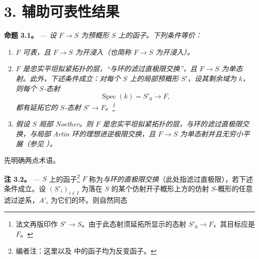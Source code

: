 
\section*{3. 辅助可表性结果}

\medskip\noindent{}\textbf{命题 3.1。} --- \textit{设 \(F\to S\) 为预概形 \(S\) 上的函子。下列条件等价：}

\begin{enumerate}\item[(i)]\textit{\(F\) 可表，且 \(F\to S\) 为开浸入（也简称 \(F\to S\) 为开浸入）。}

\item[(ii)]\textit{\(F\) 是忠实平坦拟紧拓扑的层，“与环的滤过直极限交换”，且 \(F\to S\) 为单态射。此外，下述条件成立：对每个 \(S\) 上的局部预概形 \(S'\)，设其剩余域为 \(k\)，则每个 \(S\)-态射 \[
  \operatorname{Spec}(k)=S'_0\longrightarrow F,
\] 都有延拓它的 \(S\)-态射 \(S'\to F\)。\footnote{法文再版印作 \(S'\to S\)。由于此态射须延拓所显示的态射 \(S'_0\to F\)，其目标应是 \(F\)。}}

\item[(iii)]\textit{假设 \(S\) 局部 Noether。则 \(F\) 是忠实平坦拟紧拓扑的层，与环的滤过直极限交换，与局部 Artin 环的理想进逆极限交换，且 \(F\to S\) 为单态射并且无穷小平展（参见 ）。}\end{enumerate}

先明确两点术语。

\medskip\noindent{}\textbf{注 3.2。} --- \(S\) 上的函子\footnote{编者注：这里以及  中的函子均为反变函子。} \(F\) 称为\emph{与环的直极限交换}（此处指滤过直极限），若下述条件成立。设 \((S'_i)_{i\in I}\) 为落在 \(S\) 的某个仿射开子概形上方的仿射 \(S\)-概形的任意滤过逆系，\(A'_i\) 为它们的环。则自然同态

